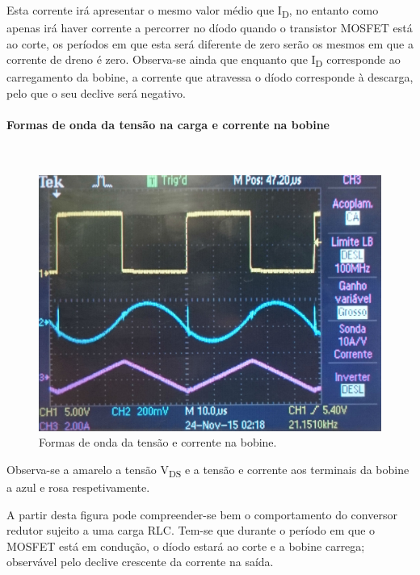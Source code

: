 \documentclass[a4paper,11pt]{article}
\numberwithin{equation}{section}
\begin{document}
Esta corrente irá apresentar o mesmo valor médio que I\textsubscript{D}, no entanto como apenas irá haver corrente a percorrer no díodo quando o transistor MOSFET está ao corte, os períodos em que esta será diferente de zero serão os mesmos em que a corrente de dreno é zero. Observa-se ainda que enquanto que I\textsubscript{D} corresponde ao carregamento da bobine, a corrente que atravessa o díodo corresponde à descarga, pelo que o seu declive será negativo.

\paragraph{Formas de onda da tensão na carga e corrente na bobine}\mbox{}\

\begin{figure}[H]
	\centering
	\includegraphics[keepaspectratio=true, scale=0.15]{img/figs/tensao_carga_corrente_bobine_ac_rlcbuck}
	\caption{Formas de onda da tensão e corrente na bobine.}
	\label{fig:tensao_carga_corrente_bobine_ac_rlcbuck}
	\vspace{-0.8em}
\end{figure} 


Observa-se a amarelo a tensão V\textsubscript{DS} e a tensão e corrente aos terminais da bobine a azul e rosa respetivamente.

A partir desta figura pode compreender-se bem o comportamento do conversor redutor sujeito a uma carga RLC. Tem-se que durante o período em que o MOSFET está em condução, o díodo estará ao corte e a bobine carrega; observável pelo declive crescente da corrente na saída. 
\end{document}
